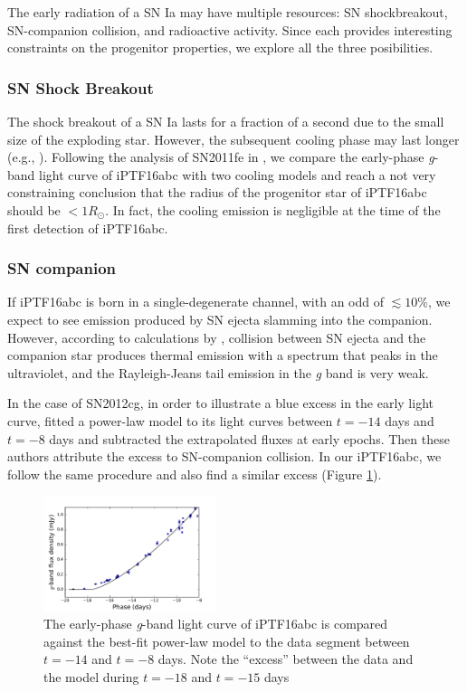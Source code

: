 \documentclass[twocolumn]{aastex61}
\newcommand{\sr}{R_\odot}
\begin{document}
The early radiation of a SN Ia may have multiple resources: SN
shockbreakout, SN-companion collision, and radioactive activity. Since
each provides interesting constraints on the progenitor properties, we
explore all the three posibilities.

\subsubsection{SN Shock Breakout}

The shock breakout of a SN Ia lasts for a fraction of a second due to
the small size of the exploding star. However, the subsequent cooling
phase may last longer (e.g., \citealt{2010ApJ...708..598P}).
Following the analysis of SN2011fe in \citet{2012ApJ...744L..17B}, we
compare the early-phase \textit{g}-band light curve of iPTF16abc with
two cooling models \citep{2011ApJ...728...63R, 2010ApJ...708..598P}
and reach a not very constraining conclusion that the radius of the
progenitor star of iPTF16abc should be $<1\sr$. In fact, the cooling
emission is negligible at the time of the first detection of
iPTF16abc.

\subsubsection{SN companion}

If iPTF16abc is born in a single-degenerate channel, with an odd of
$\lesssim10\%$, we expect to see emission produced by SN ejecta
slamming into the companion. However, according to calculations by
\citet{2010ApJ...708.1025K}, collision between SN ejecta and the
companion star produces thermal emission with a spectrum that peaks
in the ultraviolet, and the Rayleigh-Jeans tail emission in the \textit{g}
band is very weak. 

In the case of SN2012cg, in order to illustrate a blue excess in the
early light curve, \citet{2016ApJ...820...92M} fitted a power-law
model to its light curves between $t=-14$ days and $t=-8$ days and
subtracted the extrapolated fluxes at early epochs. Then these authors
attribute the excess to SN-companion collision. In our iPTF16abc, we
follow the same procedure and also find a similar excess
(Figure \ref{fig:against_sn2012cg}).

\begin{figure}[!htb]
  \centering
  \includegraphics[width=0.45\textwidth]{another_early_lc.pdf}
  \caption{The early-phase \textit{g}-band light curve of iPTF16abc is
    compared against the best-fit power-law model to the data segment
    between $t=-14$ and $t=-8$ days. Note the ``excess'' between the
    data and the model during $t=-18$ and $t=-15$ days}
  \label{fig:against_sn2012cg}
\end{figure}
\end{document}
